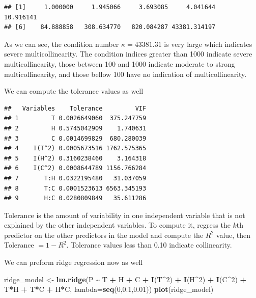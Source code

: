 \documentclass[
  11pt,
]{article}
\newenvironment{Shaded}{\begin{snugshade}}{\end{snugshade}}
\newcommand{\AttributeTok}[1]{\textcolor[rgb]{0.13,0.29,0.53}{#1}}
\newcommand{\DecValTok}[1]{\textcolor[rgb]{0.00,0.00,0.81}{#1}}
\newcommand{\FloatTok}[1]{\textcolor[rgb]{0.00,0.00,0.81}{#1}}
\newcommand{\FunctionTok}[1]{\textcolor[rgb]{0.13,0.29,0.53}{\textbf{#1}}}
\newcommand{\NormalTok}[1]{#1}
\newcommand{\OtherTok}[1]{\textcolor[rgb]{0.56,0.35,0.01}{#1}}
\newcommand{\SpecialCharTok}[1]{\textcolor[rgb]{0.81,0.36,0.00}{\textbf{#1}}}
\begin{document}
\begin{verbatim}
## [1]     1.000000     1.945066     3.693085     4.041644    10.916141
## [6]    84.888858   308.634770   820.084287 43381.314197
\end{verbatim}

As we can see, the condition number \(\kappa = 43381.31\) is very large
which indicates severe multicollinearity. The condition indices greater
than 1000 indicate severe multicollinearity, those between 100 and 1000
indicate moderate to strong multicollinearity, and those bellow 100 have
no indication of multicollinearity.

We can compute the tolerance values as well

\begin{Shaded}
\end{Shaded}

\begin{verbatim}
##   Variables    Tolerance         VIF
## 1         T 0.0026649060  375.247759
## 2         H 0.5745042909    1.740631
## 3         C 0.0014699829  680.280039
## 4    I(T^2) 0.0005673516 1762.575365
## 5    I(H^2) 0.3160238460    3.164318
## 6    I(C^2) 0.0008644789 1156.766284
## 7       T:H 0.0322195480   31.037059
## 8       T:C 0.0001523613 6563.345193
## 9       H:C 0.0280809849   35.611286
\end{verbatim}

Tolerance is the amount of variability in one independent variable that
is not explained by the other independent variables. To compute it,
regress the \(k\)th predictor on the other predictors in the model and
compute the \(R^2\) value, then Tolerance \(= 1- R^2\). Tolerance values
less than 0.10 indicate collinearity.

We can preform ridge regression now as well

\begin{Shaded}
\begin{Highlighting}[]
\NormalTok{ridge\_model }\OtherTok{\textless{}{-}} \FunctionTok{lm.ridge}\NormalTok{(P }\SpecialCharTok{\textasciitilde{}}\NormalTok{ T }\SpecialCharTok{+}\NormalTok{ H }\SpecialCharTok{+}\NormalTok{ C }\SpecialCharTok{+} \FunctionTok{I}\NormalTok{(T}\SpecialCharTok{\^{}}\DecValTok{2}\NormalTok{) }\SpecialCharTok{+} \FunctionTok{I}\NormalTok{(H}\SpecialCharTok{\^{}}\DecValTok{2}\NormalTok{) }\SpecialCharTok{+} \FunctionTok{I}\NormalTok{(C}\SpecialCharTok{\^{}}\DecValTok{2}\NormalTok{)}
                        \SpecialCharTok{+}\NormalTok{ T}\SpecialCharTok{*}\NormalTok{H }\SpecialCharTok{+}\NormalTok{ T}\SpecialCharTok{*}\NormalTok{C }\SpecialCharTok{+}\NormalTok{ H}\SpecialCharTok{*}\NormalTok{C, }\AttributeTok{lambda=}\FunctionTok{seq}\NormalTok{(}\DecValTok{0}\NormalTok{,}\FloatTok{0.1}\NormalTok{,}\FloatTok{0.01}\NormalTok{))}
\FunctionTok{plot}\NormalTok{(ridge\_model)}
\end{Highlighting}
\end{Shaded}
\end{document}
